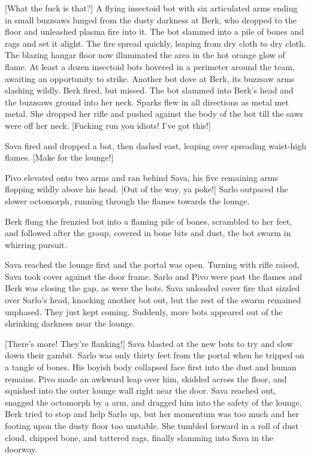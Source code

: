 [What the fuck is that?] A flying insectoid bot with six articulated arms ending in small buzzsaws lunged from the dusty darkness at Berk, who dropped to the floor and unleashed plasma fire into it. The bot slammed into a pile of bones and rags and set it alight. The fire spread quickly, leaping from dry cloth to dry cloth. The blazing hangar floor now illuminated the area in the hot orange glow of flame. At least a dozen insectoid bots hovered in a perimeter around the team, awaiting an opportunity to strike. Another bot dove at Berk, its buzzsaw arms slashing wildly. Berk fired, but missed. The bot slammed into Berk's head and the buzzsaws ground into her neck. Sparks flew in all directions as metal met metal. She dropped her rifle and pushed against the body of the bot till the saws were off her neck. [Fucking run you idiots! I've got this!] 

Sava fired and dropped a bot, then dashed east, leaping over spreading waist-high flames. [Make for the lounge!] 

Pivo elevated onto two arms and ran behind Sava, his five remaining arms flopping wildly above his head. [Out of the way, ya poke!] Sarlo outpaced the slower octomorph, running through the flames towards the lounge. 

Berk flung the frenzied bot into a flaming pile of bones, scrambled to her feet, and followed after the group, covered in bone bits and dust, the bot swarm in whirring pursuit. 

Sava reached the lounge first and the portal was open. Turning with rifle raised, Sava took cover against the door frame. Sarlo and Pivo were past the flames and Berk was closing the gap, as were the bots. Sava unloaded cover fire that sizzled over Sarlo's head, knocking another bot out, but the rest of the swarm remained unphased. They just kept coming. Suddenly, more bots appeared out of the shrinking darkness near the lounge. 

[There's more! They're flanking!] Sava blasted at the new bots to try and slow down their gambit. Sarlo was only thirty feet from the portal when he tripped on a tangle of bones. His boyish body collapsed face first into the dust and human remains. Pivo made an awkward leap over him, skidded across the floor, and squished into the outer lounge wall right near the door. Sava reached out, snagged the octomorph by a arm, and dragged him into the safety of the lounge. Berk tried to stop and help Sarlo up, but her momentum was too much and her footing upon the dusty floor too unstable. She tumbled forward in a roll of dust cloud, chipped bone, and tattered rags, finally slamming into Sava in the doorway. 

